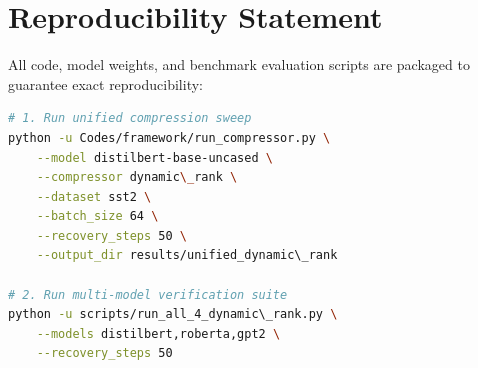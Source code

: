 \section{Reproducibility Statement}
All code, model weights, and benchmark evaluation scripts are packaged to guarantee exact reproducibility:
\begin{lstlisting}[language=bash]
# 1. Run unified compression sweep
python -u Codes/framework/run_compressor.py \
    --model distilbert-base-uncased \
    --compressor dynamic\_rank \
    --dataset sst2 \
    --batch_size 64 \
    --recovery_steps 50 \
    --output_dir results/unified_dynamic\_rank

# 2. Run multi-model verification suite
python -u scripts/run_all_4_dynamic\_rank.py \
    --models distilbert,roberta,gpt2 \
    --recovery_steps 50
\end{lstlisting}
